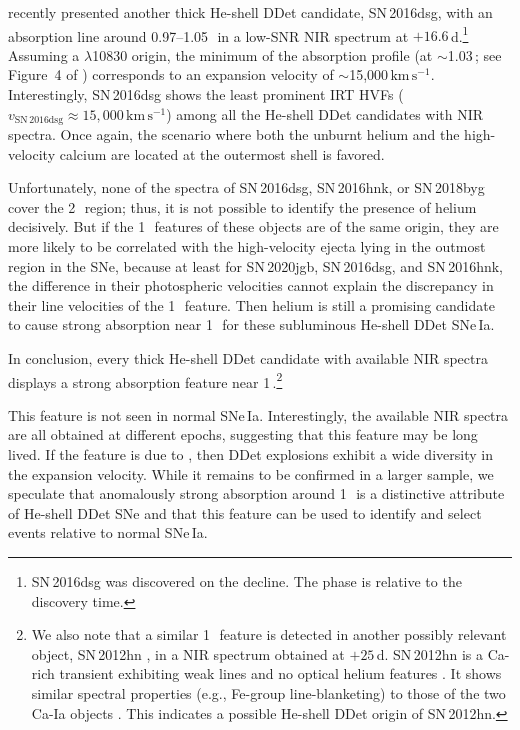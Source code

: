 \documentclass[twocolumn]{aastex631}
\newcommand{\sn}{SN\,2020jgb}
\newcommand{\kms}{$\mathrm{km}\,\mathrm{s}^{-1}$}
\begin{document}
\citet{Dong_16dsg_2022} recently presented another thick He-shell DDet candidate, SN\,2016dsg, with an absorption line around 0.97--1.05\,\micron\ in a low-SNR NIR spectrum at $+16.6$\,d.\footnote{SN\,2016dsg was discovered on the decline. The phase is relative to the discovery time.} Assuming a  $\lambda$10830 origin, the minimum of the absorption profile (at $\sim$1.03\,\micron; see Figure~4 of \citealp{Dong_16dsg_2022}) corresponds to an expansion velocity of $\sim$15,000\,\kms. Interestingly, SN\,2016dsg shows the least prominent  IRT HVFs ($v_\mathrm{SN\,2016dsg} \approx 15,000$\,\kms) among all the He-shell DDet candidates with NIR spectra. Once again, the scenario where both the unburnt helium and the high-velocity calcium are located at the outermost shell is favored.

Unfortunately, none of the spectra of SN\,2016dsg, SN\,2016hnk, or SN\,2018byg cover the 2\,\micron\ region; thus, it is not possible to identify the presence of helium decisively. But if the 1\,\micron\ features of these objects are of the same origin, they are more likely to be correlated with the high-velocity ejecta lying in the outmost region in the SNe, because at least for \sn, SN\,2016dsg, and SN\,2016hnk, the difference in their photospheric velocities cannot explain the discrepancy in their line velocities of the 1\,\micron\ feature. Then helium is still a promising candidate to cause strong absorption near 1\,\micron\ for these subluminous He-shell DDet SNe\,Ia.

In conclusion, every thick He-shell DDet candidate with available NIR spectra displays a strong absorption feature near 1\,\micron.\footnote{We also note that a similar 1\,\micron\ feature is detected in another possibly relevant object, SN\,2012hn \citep{Valenti_12hn_2014}, in a NIR spectrum obtained at $+25$\,d. SN\,2012hn is a Ca-rich transient exhibiting weak  lines and no optical helium features \citep[a Ca-Ic object in the classification scheme in][]{De_Ca-rich_2020}. It shows similar spectral properties (e.g., Fe-group line-blanketing) to those of the two Ca-Ia objects \citep{De_Ca-rich_2020}. This indicates a possible He-shell DDet origin of SN\,2012hn.} 

This feature is not seen in normal SNe\,Ia. Interestingly, the available NIR spectra are all obtained at different epochs, suggesting that this feature may be long lived. If the feature is due to , then DDet explosions exhibit a wide diversity in the expansion velocity. While it remains to be confirmed in a larger sample, we speculate that anomalously strong absorption around 1\,\micron\ is a distinctive attribute of He-shell DDet SNe and that this feature can be used to identify and select events relative to normal SNe\,Ia.
\end{document}
